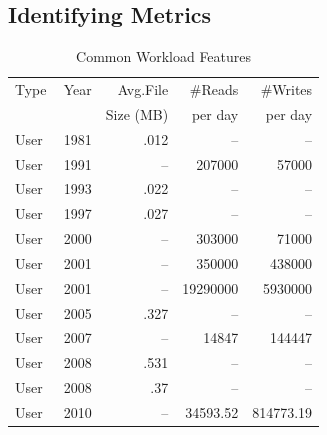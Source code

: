 \subsection{Identifying Metrics}


\begin{table}[h]
\centering
\caption{Common Workload Features}
\label{tab:workloads}
\small
\begin{tabular}{lcrrr}
\toprule
\small
Type & Year & Avg.File & \#Reads & \#Writes\\ %
&& Size (MB) &per day&per day\\ %
\midrule
User~\cite{dayal} & 1981 & .012 & -- & -- \\%
User~\cite{roselli} & 1991 & -- & 207000 & 57000 \\%
User~\cite{dayal} & 1993 & .022 & -- & -- \\%
User~\cite{dayal} & 1997 & .027 & -- & -- \\%
User~\cite{roselli} & 2000 & -- & 303000 & 71000 \\%
User~\cite{ellard} & 2001 & -- & 350000 & 438000 \\%
User~\cite{ellard} & 2001 & -- & 19290000 & 5930000 \\%
User~\cite{dayal} & 2005 & .327 & -- & -- \\%
User~\cite{narayanan2008write} & 2007 & -- & 14847 & 144447 \\%
User~\cite{dayal} & 2008 & .531 & -- & -- \\%
User~\cite{dayal} & 2008 & .37 & -- & -- \\%
User~\cite{fiu-dedup} & 2010 & -- & 34593.52 & 814773.19 \\%

\end{tabular}
\end{table}
